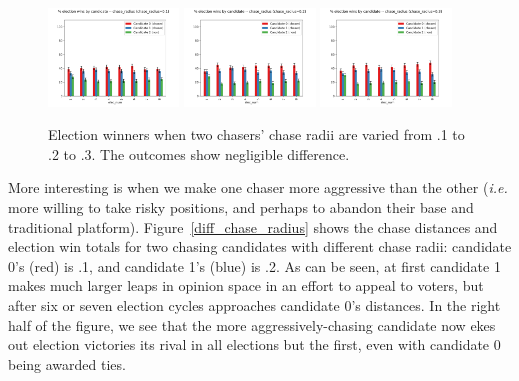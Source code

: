 \begin{figure}
\centering
\includegraphics[width=0.31\textwidth]{assets/chase_radius_.1_winners.png}
\includegraphics[width=0.31\textwidth]{assets/chase_radius_.2_winners.png}
\includegraphics[width=0.31\textwidth]{assets/chase_radius_.3_winners.png}
\caption{Election winners when two chasers' chase radii are varied from .1 to
.2 to .3. The outcomes show negligible difference.}
\label{chase_radius}
\end{figure}

More interesting is when we make one chaser more aggressive than the other
(\textit{i.e.} more willing to take risky positions, and perhaps to abandon
their base and traditional platform). Figure~\ref{diff_chase_radius} shows the
chase distances and election win totals for two chasing candidates with
different chase radii: candidate 0's (red) is .1, and candidate 1's (blue) is
.2. As can be seen, at first candidate 1 makes much larger leaps in opinion
space in an effort to appeal to voters, but after six or seven election cycles
approaches candidate 0's distances. In the right half of the figure, we see
that the more aggressively-chasing candidate now ekes out election victories
its rival in all elections but the first, even with candidate 0 being awarded
ties.

